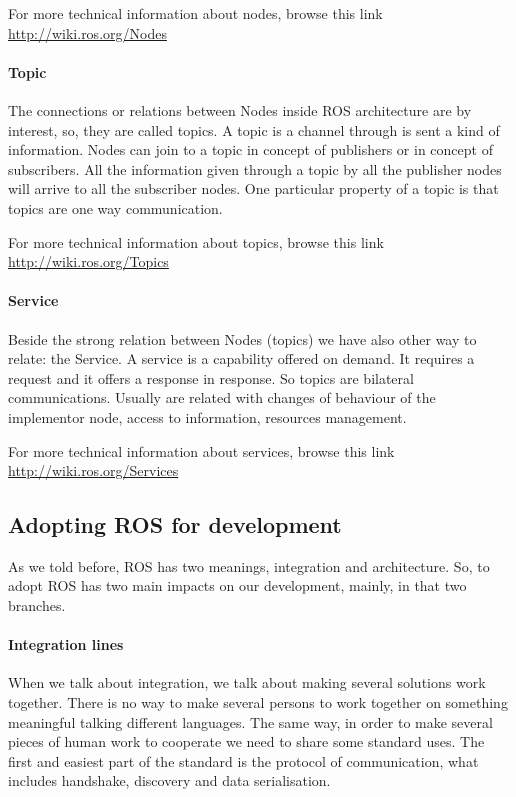 \documentclass[a4paper,10pt,twoside]{book}
\begin{document}
			For more technical information about nodes, browse this link \hyperlink{http://wiki.ros.org/Nodes}{http://wiki.ros.org/Nodes}
			
		\paragraph{Topic}
			The connections or relations between Nodes inside ROS architecture are by interest, so, they are called topics. A topic is a channel through is sent a kind of information. Nodes can join to a topic in concept of publishers or in concept of subscribers. All the information given through a topic by all the publisher nodes will arrive to all the subscriber nodes. 
			One particular property of a topic is that topics are one way communication.
	
			For more technical information about topics, browse this link \hyperlink{http://wiki.ros.org/Topics}{http://wiki.ros.org/Topics}
			
			
		\paragraph{Service}
			Beside the strong relation between Nodes (topics) we have also other way to relate: the Service. A service is a capability offered on demand. It requires a request and it offers a response in response. So topics are bilateral communications. 
			Usually are related with changes of behaviour of the implementor node, access to information, resources management. 
	
		
			For more technical information about services, browse this link \hyperlink{http://wiki.ros.org/Services}{http://wiki.ros.org/Services}
	
	\subsection{Adopting ROS for development}
	
		As we told before, ROS has two meanings, integration and architecture. So, to adopt ROS has two main impacts on our development, mainly, in that two branches.
		
		\paragraph{Integration lines}
			
				When we talk about integration, we talk about making several solutions work together. There is no way to make several persons to work together on something meaningful talking different languages. The same way, in order to make several pieces of human work to cooperate we need to share some standard uses. 
				The first and easiest part of the standard is the protocol of communication, what includes handshake, discovery and data serialisation.
				 
\end{document}
